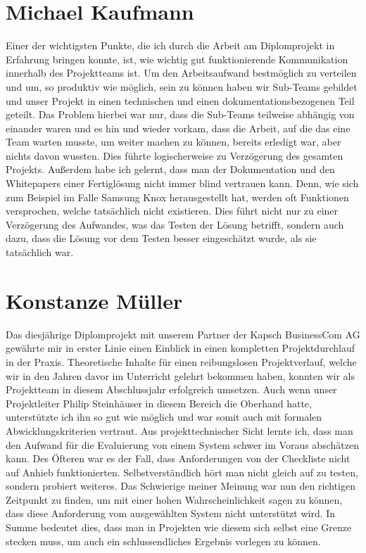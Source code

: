 \section{Michael Kaufmann}
Einer der wichtigsten Punkte, die ich durch die Arbeit am Diplomprojekt in Erfahrung bringen konnte, ist, wie wichtig gut funktionierende Kommunikation innerhalb des Projektteams ist. Um den Arbeitsaufwand bestmöglich zu verteilen und um, so produktiv wie möglich, sein zu können haben wir Sub-Teams gebildet und unser Projekt in einen technischen und einen dokumentationsbezogenen Teil geteilt.
Das Problem hierbei war nur, dass die Sub-Teams teilweise abhängig von einander waren und es hin und wieder vorkam, dass die Arbeit, auf die das eine Team warten musste, um weiter machen zu können, bereits erledigt war, aber nichts davon wussten. Dies führte logischerweise zu Verzögerung des gesamten Projekts. 
Außerdem habe ich gelernt, dass man der Dokumentation und den Whitepapers einer Fertiglösung nicht immer blind vertrauen kann. Denn, wie sich zum Beispiel im Falle Samsung Knox herausgestellt hat, werden oft Funktionen versprochen, welche tatsächlich nicht existieren. Dies führt nicht nur zu einer Verzögerung des Aufwandes, was das Testen der Lösung betrifft, sondern auch dazu, dass die Lösung vor dem Testen besser eingeschätzt wurde, als sie tatsächlich war.

\section{Konstanze Müller}
Das diesjährige Diplomprojekt mit unserem Partner der Kapsch BusinessCom AG gewährte mir in erster Linie einen Einblick in einen kompletten Projektdurchlauf in der Praxis. Theoretische Inhalte für einen reibungslosen Projektverlauf, welche wir in den Jahren davor im Unterricht gelehrt bekommen haben, konnten wir als Projektteam in diesem Abschlussjahr erfolgreich umsetzen. Auch wenn unser Projektleiter Philip Steinhäuser in diesem Bereich die Oberhand hatte, unterstützte ich ihn so gut wie möglich und war somit auch mit formalen Abwicklungskriterien vertraut. 
Aus projekttechnischer Sicht lernte ich, dass man den Aufwand für die Evaluierung von einem System schwer im Voraus abschätzen kann. Des Öfteren war es der Fall, dass Anforderungen von der Checkliste nicht auf Anhieb funktionierten. Selbstverständlich hört man nicht gleich auf zu testen, sondern probiert weiteres. Das Schwierige meiner Meinung war nun den richtigen Zeitpunkt zu finden, um mit einer hohen Wahrscheinlichkeit sagen zu können, dass diese Anforderung vom ausgewählten System nicht unterstützt wird. In Summe bedeutet dies, dass man in Projekten wie diesem sich selbst eine Grenze stecken muss, um auch ein schlussendliches Ergebnis vorlegen zu können. 

